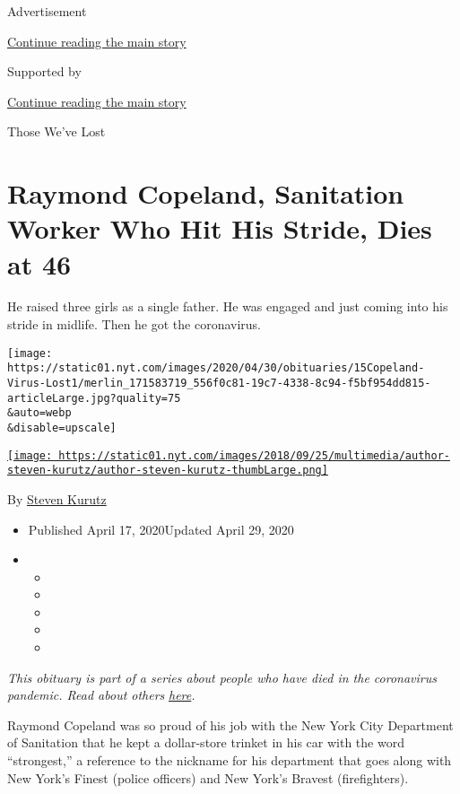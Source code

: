 Advertisement

\protect\hyperlink{after-top}{Continue reading the main story}

Supported by

\protect\hyperlink{after-sponsor}{Continue reading the main story}

Those We've Lost

\hypertarget{raymond-copeland-sanitation-worker-who-hit-his-stride-dies-at-46}{%
\section{Raymond Copeland, Sanitation Worker Who Hit His Stride, Dies at
46}\label{raymond-copeland-sanitation-worker-who-hit-his-stride-dies-at-46}}

He raised three girls as a single father. He was engaged and just coming
into his stride in midlife. Then he got the coronavirus.

\texttt{[image: https://static01.nyt.com/images/2020/04/30/obituaries/15Copeland-Virus-Lost1/merlin\_171583719\_556f0c81-19c7-4338-8c94-f5bf954dd815-articleLarge.jpg?quality=75\\\&auto=webp\\\&disable=upscale]}

\href{https://www.nytimes.com/by/steven-kurutz}{\texttt{[image: https://static01.nyt.com/images/2018/09/25/multimedia/author-steven-kurutz/author-steven-kurutz-thumbLarge.png]}}

By \href{https://www.nytimes.com/by/steven-kurutz}{Steven Kurutz}

\begin{itemize}
\item
  Published April 17, 2020Updated April 29, 2020
\item
  \begin{itemize}
  \item
  \item
  \item
  \item
  \item
  \end{itemize}
\end{itemize}

\emph{This obituary is part of a series about people who have died in
the coronavirus pandemic. Read about others}
\href{https://www.nytimes.com/series/people-who-have-died-of-the-coronavirus}{\emph{here}}\emph{.}

Raymond Copeland was so proud of his job with the New York City
Department of Sanitation that he kept a dollar-store trinket in his car
with the word ``strongest,'' a reference to the nickname for his
department that goes along with New York's Finest (police officers) and
New York's Bravest (firefighters).

